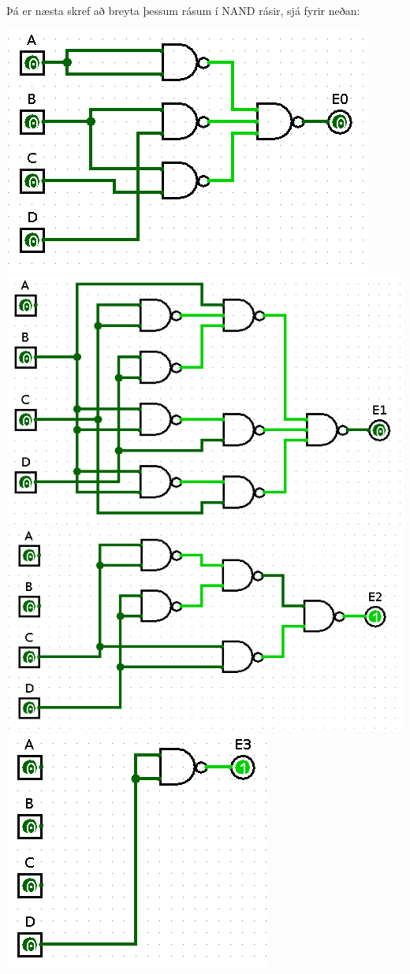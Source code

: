 \documentclass{article}
\begin{document}
Þá er næsta skref að breyta þessum rásum í NAND rásir, sjá fyrir neðan:
\begin{center}
    \includegraphics[scale=0.25]{nand0.png}
    \includegraphics[scale=0.25]{nand1.png}
    \includegraphics[scale=0.25]{nand2.png}
    \includegraphics[scale=0.25]{nand3.png}
\end{center}
\end{document}
